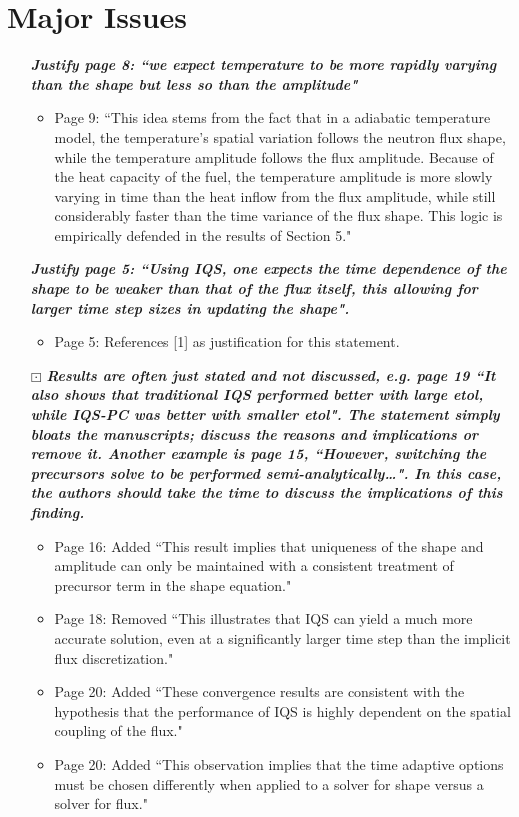 \documentclass{elsarticle}
\newcommand{\working}{$\boxdot$}
\newcommand{\done}{\checkmark}
\newcommand{\easy}[1]{\textbf{\textit{#1}}}
\newcommand{\medm}[1]{\textbf{\textit{#1}}}
\begin{document}
\section*{Major Issues}

\begin{itemize}

\item[\done] \medm{ Justify page 8: ``we expect temperature to be more rapidly varying than the shape but less so than the amplitude" }
\begin{itemize}
\item Page 9: ``This idea stems from the fact that in a adiabatic temperature model, the temperature's spatial variation follows the neutron flux shape, while the temperature amplitude follows the flux amplitude. Because of the heat capacity of the fuel, the temperature amplitude is more slowly varying in time than the heat inflow from the flux amplitude, while still considerably faster than the time variance of the flux shape. This logic is empirically defended in the results of Section 5."
\end{itemize}

\item[\done] \easy{ Justify page 5: ``Using IQS, one expects the time dependence of the shape to be weaker than that of the flux itself, this allowing for larger time step sizes in updating the shape". }
\begin{itemize}
\item Page 5: References [1] as justification for this statement.
\end{itemize}

\item[\working] \medm{  Results are often just stated and not discussed, e.g. page 19 ``It also shows that traditional IQS performed better with large etol, while IQS-PC was better with smaller etol". The statement simply bloats the manuscripts; discuss the reasons and implications or remove it. Another example is page 15, ``However, switching the precursors solve to be performed semi-analytically…".  In this case, the authors should take the time to discuss the implications of this finding. }
\begin{itemize}
\item Page 16: Added ``This result implies that uniqueness of the shape and amplitude can only be maintained with a consistent treatment of precursor term in the shape equation."
\item Page 18: Removed ``This illustrates that IQS can yield a much more accurate solution, even at a significantly larger time step than the implicit flux discretization."
\item Page 20: Added ``These convergence results are consistent with the hypothesis that the performance of IQS is highly dependent on the spatial coupling of the flux."
\item Page 20: Added ``This observation implies that the time adaptive options must be chosen differently when applied to a solver for shape versus a solver for flux."
\end{itemize}


\end{itemize}
\end{document}
